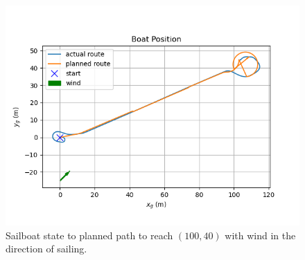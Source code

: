 \documentclass[conference]{IEEEtran}
\begin{document}
\begin{figure}
    \includegraphics[trim={0.5cm 1cm 1.25cm 1.5cm },clip]{documents/final_pres_figs/with_wind_to_40_40_pos.png}
    \caption{Sailboat state to planned path to reach \((100, 40)\) with wind in the direction of sailing.}
    \label{fig:with_wind_pos}
\end{figure}
\end{document}

